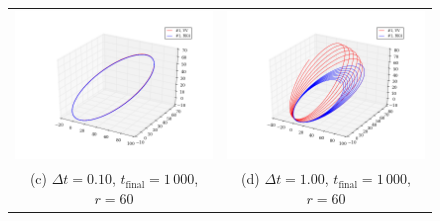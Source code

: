 \documentclass{article}
\begin{document}
\begin{multicols}{2}
\begin{figure}
\begin{center}
\begin{tabular}{cc}
	 \includegraphics[width=90mm]{Images/comparison_orbit_01_dist60.png}
	& \includegraphics[width=90mm]{Images/comparison_orbit_1_dist60.png} \\
	(c) $\Delta t = 0.10$, $t_{\mathrm{final}} = 1\,000$, $r = 60$				& (d) $\Delta t = 1.00$, $t_{\mathrm{final}} = 1\,000$, $r = 60$  \\[6pt]
	

\end{tabular}
\end{center}
\end{figure}
\end{multicols}
\end{document}
